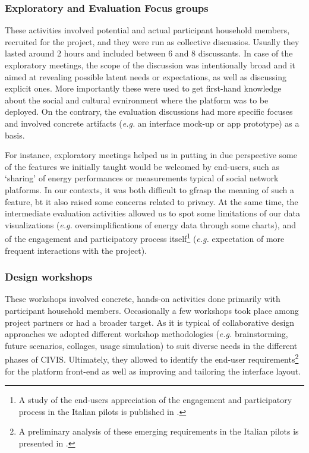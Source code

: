 %
%


\subsubsection{Exploratory and Evaluation Focus groups} %

These activities involved potential and actual participant household members, recruited for the project, and they
were run as collective discussios. Usually they lasted around 2 hours and included between 6 and 8 discussants.
In case of the exploratory meetings, the scope of the discussion was intentionally broad and it aimed at revealing possible latent
needs or expectations, as well as discussing explicit ones. More importantly these were used to get first-hand knowledge
about the social and cultural evnironment where the platform was to be deployed. On the contrary, the evaluation discussions
had more specific focuses and involved concrete artifacts (\textit{e.g.} an interface mock-up or app prototype)
as a basis.

For instance, exploratory meetings helped us in putting in due perspective some of the features we initially taught
would be welcomed by end-users, such as `sharing' of energy performances or measurements typical of social network platforms.
In our contexts, it was both difficult to gfrasp the meaning of such a feature, bt it also raised
some concerns related to privacy. At the same time, the intermediate evaluation activities allowed us to spot some
limitations of our data visualizations (\textit{e.g.} oversimplifications of energy data through some charts),
and of the engagement and participatory process itself\footnote{A study of the end-users appreciation of the engagement and participatory process in the Italian pilots
is published in \cite{capaccioli_exploring_2017}.}
(\textit{e.g.} expectation of more frequent interactions with the project).


\subsubsection{Design workshops} %

These workshops involved concrete, hands-on activities done primarily with participant household members.
Occasionally a few workshops took place among project partners or had a broader target.
As it is typical of collaborative design approaches we adopted different workshop methodologies (\textit{e.g.} brainstorming, future scenarios,
collages, usage simulation) to suit diverse needs in the different phases of CIVIS.
Ultimately, they allowed to identify the end-user requirements\footnote{A preliminary analysis of these emerging requirements in the Italian pilots
is presented in \cite{capaccioli_participatory_2016}.} for the platform front-end as well as
improving and tailoring the interface layout.

